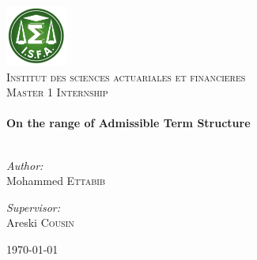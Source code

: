 \begin{titlepage}
  \begin{center}
    \includegraphics[width=0.15\textwidth]{./isfa}~\\[1cm]
    \textsc{\LARGE Institut des sciences actuariales et financieres}\\[1.5cm]
    \textsc{\Large Master 1 Internship}\\[0.5cm]
    \HRule \\[0.4cm]
{ \huge \bfseries On the range of Admissible Term Structure\\[0.4cm] }
\HRule \\[1.5cm]



\begin{minipage}{0.4\textwidth}
\begin{flushleft} \large
\emph{Author:}\\
Mohammed \textsc{Ettabib}
\end{flushleft}
\end{minipage}
\begin{minipage}{0.4\textwidth}
\begin{flushright} \large
\emph{Supervisor:} \\
Areski \textsc{Cousin}
\end{flushright}
\end{minipage}

\vfill

{\large \today}
  \end{center}
\end{titlepage}